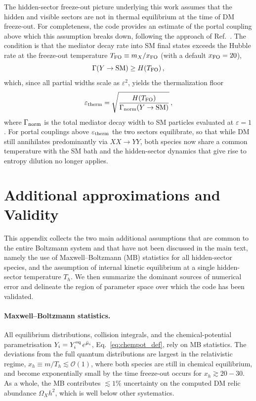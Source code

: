 \documentclass[11pt]{article}
\numberwithin{equation}{section}
\begin{document}
The hidden-sector freeze-out picture underlying this work assumes that the hidden and visible sectors are not in thermal equilibrium at the time of DM freeze-out. For completeness, the code provides an estimate of the portal coupling above which this assumption breaks down, following the approach of Ref.~\cite{Hu:2025thq}. The condition is that the mediator decay rate into SM final states exceeds the Hubble rate at the freeze-out temperature $T_{\rm FO}\equiv m_X/x_{\rm FO}$ (with a default $x_{\rm FO}=20$),
\begin{equation}
    \Gamma(Y\to\mathrm{SM}) \geq H(T_{\rm FO})\,,
\end{equation}
which, since all partial widths scale as $\varepsilon^2$, yields the thermalization floor
\begin{equation}
    \varepsilon_{\rm therm} = \sqrt{\frac{H(T_{\rm FO})}{\Gamma_{\rm norm}(Y\to\mathrm{SM})}}\,,
    \label{eq:eps_therm}
\end{equation}
where $\Gamma_{\rm norm}$ is the total mediator decay width to SM particles evaluated at $\varepsilon=1$. For portal couplings above $\varepsilon_{\rm therm}$ the two sectors equilibrate, so that while DM still annihilates predominantly via $XX\to YY$, both species now share a common temperature with the SM bath and the hidden-sector dynamics that give rise to entropy dilution no longer applies.

\appendix

\section{Additional approximations and Validity}
\label{sec:assumptions}
 
This appendix collects the two main additional assumptions that are common to the entire Boltzmann system and that have not been discussed in the main text, namely the use of Maxwell–Boltzmann (MB) statistics for all hidden-sector species, and the assumption of internal kinetic equilibrium at a single hidden-sector temperature $T_h$. We then summarize the dominant sources of numerical error and delineate the region of parameter space over which the code has been validated.
 
\paragraph{Maxwell--Boltzmann statistics.}
All equilibrium distributions, collision integrals, and the chemical-potential parametrisation $Y_i = Y_i^{\rm eq}\,e^{\bar\mu_i}$, Eq.~\eqref{eq:chempot_def}, rely on MB statistics. The deviations from the full quantum distributions are largest in the relativistic regime, $x_h\equiv m/T_h \lesssim \mathcal{O}(1)$, where both species are still in chemical equilibrium, and become exponentially small by the time freeze-out occurs for $x_h\gtrsim 20-30$. As a whole, the MB contributes $\lesssim 1\%$ uncertainty on the computed DM relic abundance $\Omega_{X} h^2$, which is well below other systematics.
 
\end{document}
